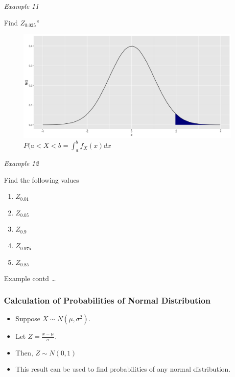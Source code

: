 \documentclass[]{book}
\providecommand{\tightlist}{%
  \setlength{\itemsep}{0pt}\setlength{\parskip}{0pt}}
\begin{document}
\emph{Example 11}

Find \(Z_{0.025}\)''

\begin{figure}

{\centering \includegraphics{figure/norm3-1} 

}

\caption{$P(a< X < b = \int_a^b f_X(x)dx$}\label{fig:norm3}
\end{figure}

\emph{Example 12}

Find the following values

\begin{enumerate}
\def\labelenumi{\arabic{enumi})}
\tightlist
\item
  \(Z_{0.01}\)
\item
  \(Z_{0.05}\)
\item
  \(Z_{0.9}\)
\item
  \(Z_{0.975}\)
\item
  \(Z_{0.85}\)
\end{enumerate}

\newpage

Example contd \ldots{}

\newpage

\hypertarget{calculation-of-probabilities-of-normal-distribution}{%
\subsubsection{Calculation of Probabilities of Normal Distribution}\label{calculation-of-probabilities-of-normal-distribution}}

\begin{itemize}
\tightlist
\item
  Suppose \(X \sim N(\mu, \sigma^2)\).
\item
  Let \(Z = \frac{x-\mu}{\sigma}\).
\item
  Then, \(Z \sim N(0,1)\)
\item
  This result can be used to find probabilities of any normal distribution.
\end{itemize}
\end{document}
